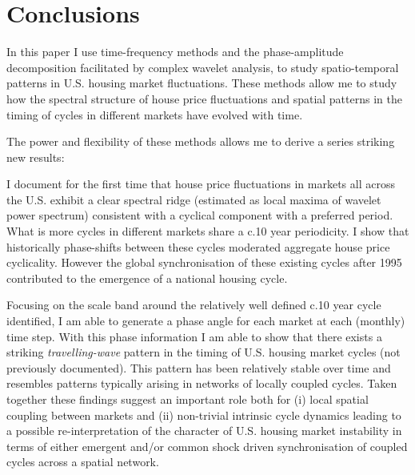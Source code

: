 \documentclass[11pt]{article}
\begin{document}
\section{Conclusions} \label{conclusion}

In this paper I use time-frequency methods and the phase-amplitude decomposition facilitated by complex wavelet analysis, to study spatio-temporal patterns in U.S. housing market fluctuations. These methods allow me to study how the spectral structure of house price fluctuations and spatial patterns in the timing of cycles in different markets have evolved with time. 

The power and flexibility of these methods allows me to derive a series striking new results:

I document for the first time that house price fluctuations in markets all across the U.S. exhibit a clear spectral ridge (estimated as local maxima of wavelet power spectrum) consistent with a cyclical component with a preferred period. What is more cycles in different markets share a c.10 year periodicity. I show that historically phase-shifts between these cycles moderated aggregate house price cyclicality. However the global synchronisation of these existing cycles after 1995 contributed to the emergence of a national housing cycle.

Focusing on the scale band around the relatively well defined c.10 year cycle identified, I am able to generate a phase angle for each market at each (monthly) time step. With this phase information I am able to show that there exists a striking \textit{travelling-wave} pattern in the timing of U.S. housing market cycles (not previously documented). This pattern has been relatively stable over time and resembles patterns typically arising in networks of locally coupled cycles. Taken together these findings suggest an important role both for (i) local spatial coupling between markets and (ii) non-trivial intrinsic cycle dynamics leading to a possible re-interpretation of the character of U.S. housing market instability in terms of either emergent and/or common shock driven synchronisation of coupled cycles across a spatial network.
\end{document}
